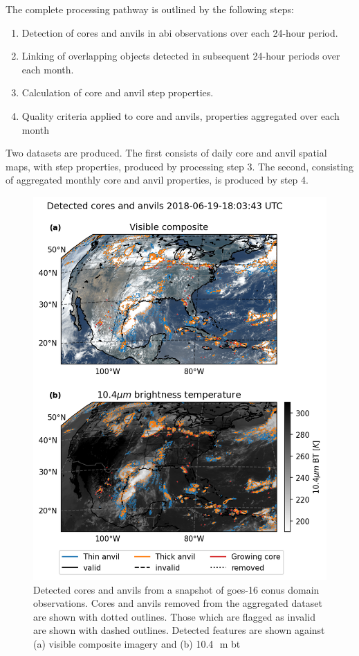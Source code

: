 The complete processing pathway is outlined by the following steps:

\begin{enumerate}
    \item Detection of cores and anvils in \acrshort{abi} observations over each 24-hour period.
    \item Linking of overlapping objects detected in subsequent 24-hour periods over each month.
    \item Calculation of core and anvil step properties. 
    \item Quality criteria applied to core and anvils, properties aggregated over each month
\end{enumerate}

Two datasets are produced. The first consists of daily core and anvil spatial maps, with step properties, produced by processing step 3. 
The second, consisting of aggregated monthly core and anvil properties, is produced by step 4.

\begin{figure}[tp]
    \centering
    \includegraphics[width=\textwidth]{figures/ch2_02.png}
    \caption[
    Detected cores and anvils from a snapshot of \acrshort{goes}-16 \acrshort{conus} domain observations
    ]{
    Detected cores and anvils from a snapshot of \acrshort{goes}-16 \acrshort{conus} domain observations. Cores and anvils removed from the aggregated dataset are shown with dotted outlines. Those which are flagged as invalid are shown with dashed outlines. Detected features are shown against (a) visible composite imagery and (b) 10.4\,\unit{\mu m} \acrshort{bt}
    }
    \label{fig:conus_detected_dccs}
\end{figure}

